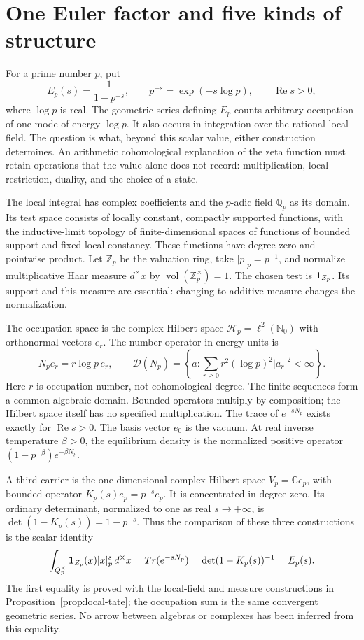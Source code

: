 \section{One Euler factor and five kinds of structure}
\label{sec:opening}

For a prime number $p$, put
\[
 E_p(s)=\frac1{1-p^{-s}},\qquad
 p^{-s}=\exp(-s\log p),\qquad \operatorname{Re}s>0,
\]
where $\log p$ is real. The geometric series defining $E_p$ counts
arbitrary occupation of one mode of energy $\log p$. It also occurs in
integration over the rational local field. The question is what, beyond
this scalar value, either construction determines. An arithmetic
cohomological explanation of the zeta function must retain operations
that the value alone does not record: multiplication, local restriction,
duality, and the choice of a state.

The local integral has complex coefficients and the $p$-adic field
$\mathbb Q_p$ as its domain. Its test space consists of locally constant,
compactly supported functions, with the inductive-limit topology of
finite-dimensional spaces of functions of bounded support and fixed
local constancy. These functions have degree zero and pointwise product.
Let $\mathbb Z_p$ be the valuation ring, take $|p|_p=p^{-1}$, and
normalize multiplicative Haar measure $d^\times x$ by
$\operatorname{vol}(\mathbb Z_p^\times)=1$. The chosen test is
$\mathbf 1_{Z_p}$. Its support and this measure are essential:
changing to additive measure changes the normalization.

The occupation space is the complex Hilbert space
$\mathscr H_p=\ell^2(\mathbb N_0)$ with orthonormal vectors $e_r$.
The number operator in energy units is
\[
 N_pe_r=r\log p\,e_r,\qquad
 \mathcal D(N_p)=
 \left\{a:\sum_{r\ge0}r^2(\log p)^2|a_r|^2<\infty\right\}.
\]
Here $r$ is occupation number, not cohomological degree. The finite
sequences form a common algebraic domain. Bounded operators multiply by
composition; the Hilbert space itself has no specified multiplication.
The trace of $e^{-sN_p}$ exists exactly for $\operatorname{Re}s>0$.
The basis vector $e_0$ is the vacuum. At real inverse temperature
$\beta>0$, the equilibrium density is the normalized positive operator
$(1-p^{-\beta})e^{-\beta N_p}$.

A third carrier is the one-dimensional complex Hilbert space
$V_p=\mathbb C e_p$, with bounded operator $K_p(s)e_p=p^{-s}e_p$.
It is concentrated in degree zero. Its ordinary determinant, normalized
to one as real $s\to+\infty$, is $\det(1-K_p(s))=1-p^{-s}$.
Thus the comparison of these three constructions is the scalar identity
\begin{equation}
 \int_{Q_p^\times}\mathbf 1_{Z_p}(x)|x|_p^s\,d^\times x
 =Tr(e^{-sN_p})
 =\det(1-K_p(s))^{-1}=E_p(s).
 \label{eq:opening-euler}
\end{equation}
The first equality is proved with the local-field and measure
constructions in Proposition~\ref{prop:local-tate}; the occupation sum
is the same convergent geometric series. No arrow between algebras or
complexes has been inferred from this equality.

